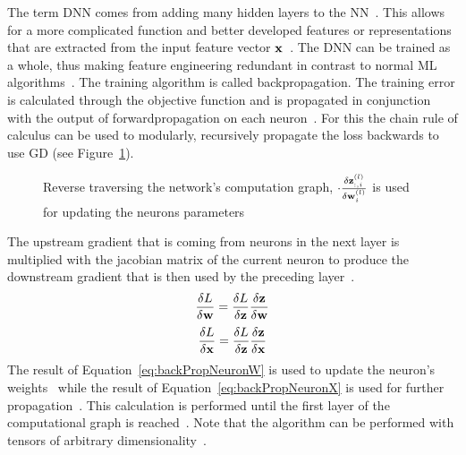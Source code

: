 The term \ac{DNN} comes from adding many hidden layers to the \ac{NN}~\citep{shrestha_review_2019}.
This allows for a more complicated function and better developed features or representations that
are extracted from the input feature vector $\textbf{x}$~\citep{oyedotun_deep_2015}.
The \ac{DNN} can be trained as a whole, thus making feature engineering redundant in contrast to
normal \ac{ML} algorithms~\citep{arpteg_software_2018}.
The training algorithm is called backpropagation.
The training error is calculated through the objective function and is propagated
in conjunction with the output of forwardpropagation on each neuron~\citep{goodfellow_deep_2016}.
For this the chain rule of calculus can be used to modularly, recursively propagate the
loss backwards to use \ac{GD} (see Figure~\ref{fig:error-backpropagation}).
\begin{figure}[ht]
	\centering
    
	\caption[Backpropagation of errors through the network.]{%
        Reverse traversing the network's computation graph,
        $\cdot \frac{\delta \textbf{z}_{:,i}^{(l)}}{\delta \textbf{w}_i^{(l)}}$ is used for
        updating the neurons parameters\label{fig:error-backpropagation}
    }
\end{figure}
The upstream gradient that is coming from neurons in the next layer is multiplied with the
jacobian matrix of the current neuron to produce the downstream gradient that is then used by
the preceding layer~\citep{boue_deep_2018,goodfellow_deep_2016}.
\begin{equation}\label{eq:backPropNeuronW}
    \frac{\delta L}{\delta\textbf{w}} = \frac{\delta L}{\delta\textbf{z}} \frac{\delta\textbf{z}}{\delta\textbf{w}}
\end{equation}
\begin{equation}\label{eq:backPropNeuronX}
    \frac{\delta L}{\delta\textbf{x}} = \frac{\delta L}{\delta\textbf{z}}\frac{\delta\textbf{z}}{\delta\textbf{x}}
\end{equation}
The result of Equation~\ref{eq:backPropNeuronW} is used to update the neuron's weights \w\ while
the result of Equation~\ref{eq:backPropNeuronX} is used for further propagation~\citep{boue_deep_2018}.
This calculation is performed until the first layer of the computational graph is
reached~\citep{goodfellow_deep_2016}.
Note that the algorithm can be performed with tensors of arbitrary
dimensionality~\citep{goodfellow_deep_2016}.

